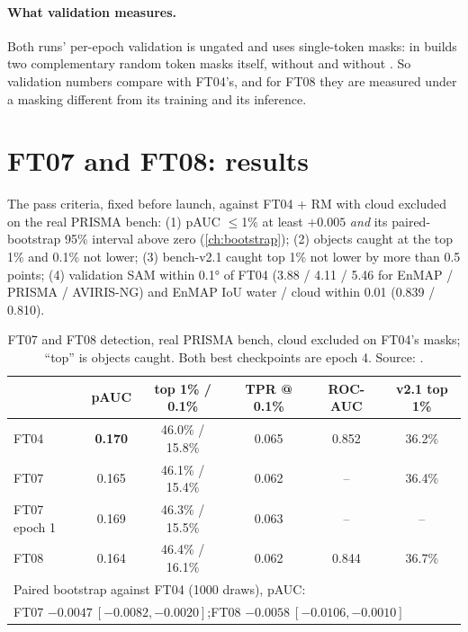 \paragraph{What validation measures.} Both runs' per-epoch validation is ungated and uses single-token masks:
 in  builds two complementary random token masks
itself, without  and without . So validation numbers compare
with FT04's, and for FT08 they are measured under a masking different from its training and its inference.

\section{FT07 and FT08: results}\label{sec:decoderwork:ft0708}

The pass criteria, fixed before launch, against FT04 + RM with cloud excluded on the real PRISMA bench:
(1) pAUC $\le$1\% at least $+0.005$ \emph{and} its paired-bootstrap 95\% interval above zero
(\cref{ch:bootstrap}); (2) objects caught at the top 1\% and 0.1\% not lower; (3) bench-v2.1 caught top 1\% not
lower by more than 0.5 points; (4) validation SAM within 0.1° of FT04 (3.88 / 4.11 / 5.46 for EnMAP / PRISMA /
AVIRIS-NG) and EnMAP IoU water / cloud within 0.01 (0.839 / 0.810).

\begin{table}[htbp]
\centering\small
\begin{tabular}{lccccc}
\toprule
 & pAUC & top 1\% / 0.1\% & TPR @ 0.1\% & ROC-AUC & v2.1 top 1\%\\
\midrule
FT04 & \textbf{0.170} & 46.0\% / 15.8\% & 0.065 & 0.852 & 36.2\%\\
FT07 & 0.165 & 46.1\% / 15.4\% & 0.062 & -- & 36.4\%\\
FT07 epoch 1 & 0.169 & 46.3\% / 15.5\% & 0.063 & -- & --\\
FT08 & 0.164 & 46.4\% / 16.1\% & 0.062 & 0.844 & 36.7\%\\
\midrule
\multicolumn{6}{l}{Paired bootstrap against FT04 (1000 draws), pAUC:}\\
\multicolumn{6}{l}{\quad FT07 $-0.0047\ [-0.0082,-0.0020]$;\quad FT08 $-0.0058\ [-0.0106,-0.0010]$}\\
\bottomrule
\end{tabular}
\caption{FT07 and FT08 detection, real PRISMA bench, cloud excluded on FT04's masks; ``top'' is objects caught.
Both best checkpoints are epoch 4. Source: .}
\label{tab:decoderwork:ft0708}
\end{table}

